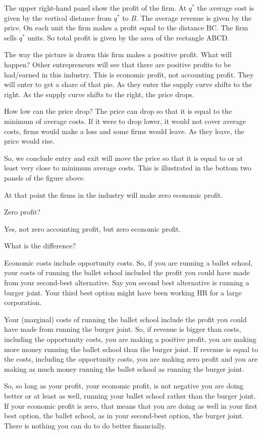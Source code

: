 \documentclass[
]{book}
\begin{document}
The upper right-hand panel show the profit of the firm. At \(q^*\) the average cost is given by the vertical distance from \(q^*\) to \(B\). The average revenue is given by the price. On each unit the firm makes a profit equal to the distance \(\text{BC}\). The firm sells \(q^*\) units. So total profit is given by the area of the rectangle \(\text{ABCD}\).

The way the picture is drawn this firm makes a positive profit. What will happen? Other entrepreneurs will see that there are positive profits to be had/earned in this industry. This is economic profit, not accounting profit. They will enter to get a share of that pie. As they enter the supply curve shifts to the right. As the supply curve shifts to the right, the price drops.

How low can the price drop? The price can drop so that it is equal to the minimum of average costs. If it were to drop lower, it would not cover average costs, firms would make a loss and some firms would leave. As they leave, the price would rise.

So, we conclude entry and exit will move the price so that it is equal to or at least very close to minimum average costs. This is illustrated in the bottom two panels of the figure above.

At that point the firms in the industry will make zero economic profit.

Zero profit?

Yes, not zero accounting profit, but zero economic profit.

What is the difference?

Economic costs include opportunity costs. So, if you are running a ballet school, your costs of running the ballet school included the profit you could have made from your second-best alternative. Say you second best alternative is running a burger joint. Your third best option might have been working HR for a large corporation.

Your (marginal) costs of running the ballet school include the profit you could have made from running the burger joint. So, if revenue is bigger than costs, including the opportunity costs, you are making a positive profit, you are making more money running the ballet school than the burger joint. If revenue is equal to the costs, including the opportunity costs, you are making zero profit and you are making as much money running the ballet school as running the burger joint.

So, so long as your profit, your economic profit, is not negative you are doing better or at least as well, running your ballet school rather than the burger joint. If your economic profit is zero, that means that you are doing as well in your first best option, the ballet school, as in your second-best option, the burger joint. There is nothing you can do to do better financially.
\end{document}
